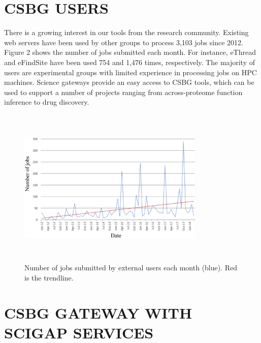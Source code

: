\documentclass[sigconf]{acmart}
\begin{document}
\section{CSBG USERS}

There is a growing interest in our tools from the research community. Existing web servers have been used by other groups to process 3,103 jobs since 2012. Figure 2 shows the number of jobs submitted each month. For instance, eThread and eFindSite have been used 754 and 1,476 times, respectively. The majority of users are experimental groups with limited experience in processing jobs on HPC machines. Science gateways provide an easy access to CSBG tools, which can be used to support a number of projects ranging from across-proteome function inference to drug discovery.

\begin{figure}
\includegraphics[height=3in, width=3.5in]{Fig2-usage.png}
\caption{Number of jobs submitted by external users each month (blue). Red is the trendline.}
\end{figure}

\section{CSBG GATEWAY WITH SCIGAP SERVICES}
\end{document}
